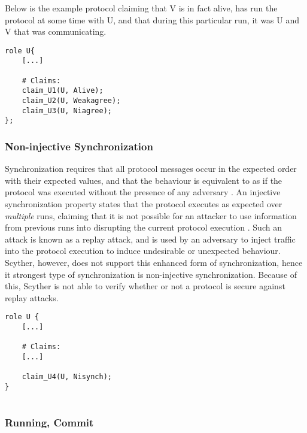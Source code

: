 
Below is the example protocol claiming that V is in fact alive, has run the protocol at some time with U, and that during this particular run, it was U and V that was communicating.\newline

\begin{lstlisting}
role U{
	[...]
	
	# Claims:
	claim_U1(U, Alive);
	claim_U2(U, Weakagree);
	claim_U3(U, Niagree);
};
\end{lstlisting} 


\subsubsection{Non-injective Synchronization}

Synchronization requires that all protocol messages occur in the expected order with their expected values, and that the behaviour is equivalent to as if the protocol was executed without the presence of any adversary \cite{cremers2006injective}. An injective synchronization property states that the protocol executes as expected over \emph{multiple} runs, claiming that it is not possible for an attacker to use information from previous runs into disrupting the current protocol execution \cite{cremers2005operational}. Such an attack is known as a replay attack, and is used by an adversary to inject traffic into the protocol execution to induce undesirable or unexpected behaviour. Scyther, however, does not support this enhanced form of synchronization, hence it strongest type of synchronization is non-injective synchronization. Because of this, Scyther is not able to verify whether or not a protocol is secure against replay attacks.\newline

\begin{lstlisting}
role U {
	[...]

	# Claims:	
	[...]
	
	claim_U4(U, Nisynch);
}


\end{lstlisting}



\subsubsection{Running, Commit}

